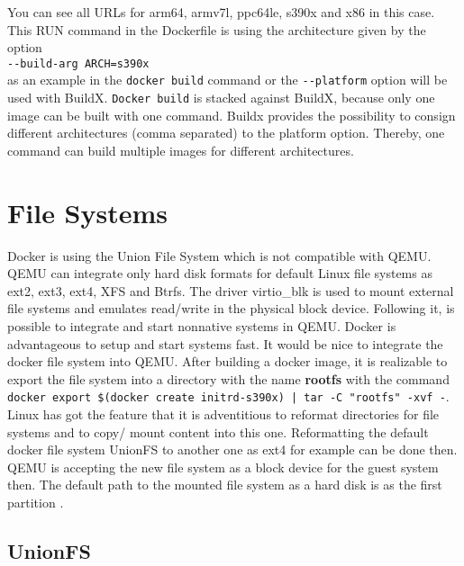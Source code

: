 You can see all URLs for arm64, armv7l, ppc64le, s390x and x86 in this case. This RUN command in the Dockerfile is using the architecture given by the option \\
\lstinline!--build-arg ARCH=s390x! \\
as an example in the \lstinline!docker build! command or the \lstinline!--platform! option will be used with BuildX.
\lstinline!Docker build! is stacked against BuildX, because only one image can be built with one command.
Buildx provides the possibility to consign different architectures (comma separated) to the platform option. Thereby, one command can build multiple images for different architectures.

\section{File Systems}\label{FileSystems}

Docker is using the Union File System which is not compatible with QEMU. \\
QEMU can integrate only hard disk formats for default Linux file systems as ext2, ext3, ext4, XFS and Btrfs. 
The driver virtio\_blk is used to mount external file systems and emulates read/write in the physical block device\cite{Barboza2018}. Following it, is possible to integrate and start nonnative systems in QEMU. 
Docker is advantageous to setup and start systems fast. 
It would be nice to integrate the docker file system into QEMU. After building a docker image, it is realizable to export the file system into a directory with the name \textbf{rootfs} with the command \\ 
\lstinline!docker export $(docker create initrd-s390x) | tar -C "rootfs" -xvf -!. \\

Linux has got the feature that it is adventitious to reformat directories for file systems and to copy/ mount content into this one. Reformatting the default docker file system UnionFS to another one as ext4 for example can be done then. \\
QEMU is accepting the new file system as a block device for the guest system then. The default path to the mounted file system as a hard disk is  as the first partition \cite[~p.22]{White2020}.

\subsection{UnionFS}\label{UnionFS}

